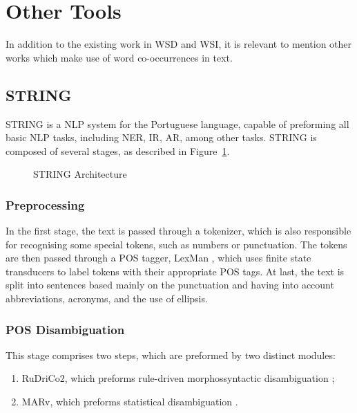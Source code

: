 \section{Other Tools}

In addition to the existing work in \ac{WSD} and \ac{WSI}, it is relevant to
mention other works which make use of word co-occurrences in text.

\subsection{STRING}
\label{sec:string}

\ac{STRING} \cite{mamede2012string} is a \ac{NLP} system for the Portuguese
language, capable of preforming all basic \ac{NLP} tasks, including \ac{NER},
\ac{IR}, \ac{AR}, among other tasks. \ac{STRING} is composed of several stages,
as described in Figure~\ref{fig:stringarch}.

\begin{figure}[ht]
 \caption{\acs*{STRING} Architecture}
 \label{fig:stringarch}
 \centering
 
\end{figure}

\subsubsection*{Preprocessing}

In the first stage, the text is passed through a tokenizer, which is also
responsible for recognising some special tokens, such as numbers or punctuation.
The tokens are then passed through a \ac{POS} tagger, LexMan
\cite{vicente2013lexman}, which uses finite state transducers to label tokens
with their appropriate \ac{POS} tags. At last, the text is split into sentences
based mainly on the punctuation and having into account abbreviations, acronyms,
and the use of ellipsis.

\subsubsection*{POS Disambiguation}

This stage comprises two steps, which are preformed by two distinct modules:

\begin{enumerate}
 \item \ac{RuDriCo2}, which preforms rule-driven morphossyntactic disambiguation
\cite{diniz2010conversor};
 \item \ac{MARv}, which preforms statistical disambiguation
\cite{ribeiro2003anotacao}.
\end{enumerate}

